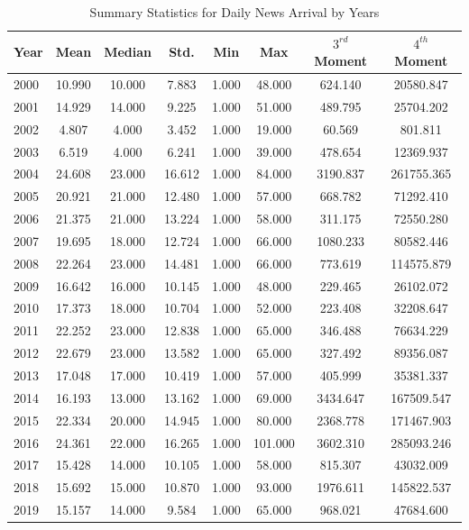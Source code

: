 \documentclass[12pt]{article}
\begin{document}
	\begin{table}[H]
		\centering
		\small
		\caption{Summary Statistics for Daily News Arrival by Years}
		\begin{tabular}{l|c|c|c|c|c|c|c}
		\toprule
		Year & Mean & Median & Std. & Min & Max & $3^{rd}$ Moment & $4^{th}$ Moment \\
		\midrule
2000 & 10.990 & 10.000 & 7.883 & 1.000 & 48.000 & 624.140 & 20580.847\\
2001 & 14.929 & 14.000 & 9.225 & 1.000 & 51.000 & 489.795 & 25704.202\\
2002 & 4.807 & 4.000 & 3.452 & 1.000 & 19.000 & 60.569 & 801.811\\
2003 & 6.519 & 4.000 & 6.241 & 1.000 & 39.000 & 478.654 & 12369.937\\
2004 & 24.608 & 23.000 & 16.612 & 1.000 & 84.000 & 3190.837 & 261755.365\\
2005 & 20.921 & 21.000 & 12.480 & 1.000 & 57.000 & 668.782 & 71292.410\\
2006 & 21.375 & 21.000 & 13.224 & 1.000 & 58.000 & 311.175 & 72550.280\\
2007 & 19.695 & 18.000 & 12.724 & 1.000 & 66.000 & 1080.233 & 80582.446\\
2008 & 22.264 & 23.000 & 14.481 & 1.000 & 66.000 & 773.619 & 114575.879\\
2009 & 16.642 & 16.000 & 10.145 & 1.000 & 48.000 & 229.465 & 26102.072\\
2010 & 17.373 & 18.000 & 10.704 & 1.000 & 52.000 & 223.408 & 32208.647\\
2011 & 22.252 & 23.000 & 12.838 & 1.000 & 65.000 & 346.488 & 76634.229\\
2012 & 22.679 & 23.000 & 13.582 & 1.000 & 65.000 & 327.492 & 89356.087\\
2013 & 17.048 & 17.000 & 10.419 & 1.000 & 57.000 & 405.999 & 35381.337\\
2014 & 16.193 & 13.000 & 13.162 & 1.000 & 69.000 & 3434.647 & 167509.547\\
2015 & 22.334 & 20.000 & 14.945 & 1.000 & 80.000 & 2368.778 & 171467.903\\
2016 & 24.361 & 22.000 & 16.265 & 1.000 & 101.000 & 3602.310 & 285093.246\\
2017 & 15.428 & 14.000 & 10.105 & 1.000 & 58.000 & 815.307 & 43032.009\\
2018 & 15.692 & 15.000 & 10.870 & 1.000 & 93.000 & 1976.611 & 145822.537\\
2019 & 15.157 & 14.000 & 9.584 & 1.000 & 65.000 & 968.021 & 47684.600\\
		\bottomrule
		\end{tabular}
	\end{table}
	
\end{document}
